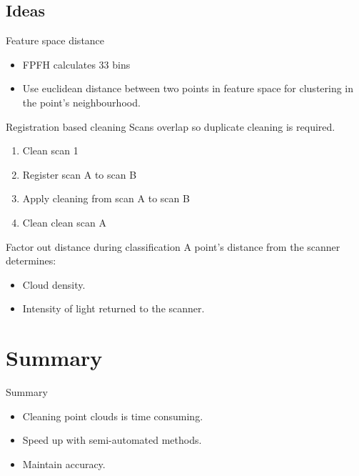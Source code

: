 \documentclass{beamer}
\begin{document}
\subsection{Ideas}

\begin{frame}{Feature space distance}
\begin{itemize}
\item FPFH calculates 33 bins
\item Use euclidean distance between two points in feature space for clustering in the point's neighbourhood.
\end{itemize}  

\end{frame}

\begin{frame}{Registration based cleaning}
  Scans overlap so duplicate cleaning is required.
  \begin{enumerate}
  \item Clean scan 1
  \item Register scan A to scan B
  \item Apply cleaning from scan A to scan B
  \item Clean clean scan A
  \end{enumerate}

\end{frame}

\begin{frame}{Factor out distance during classification}
A point's distance from the scanner determines:
\begin{itemize}
\item Cloud density.
\item Intensity of light returned to the scanner.
\end{itemize}
  
\end{frame}

\section*{Summary}

\begin{frame}{Summary}

  \begin{itemize}
  \item
    Cleaning point clouds is time consuming.
  \item
    Speed up with semi-automated methods.
  \item
    Maintain accuracy.
  \end{itemize}
  
\end{frame}
\end{document}
